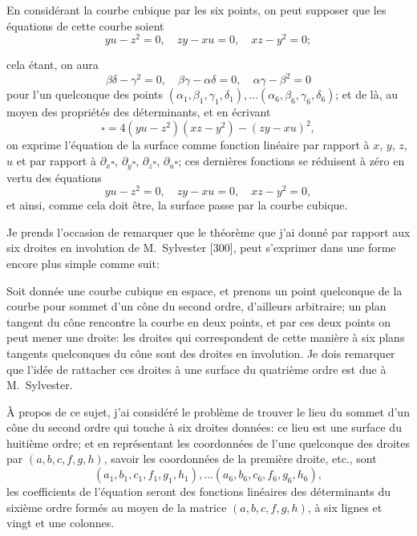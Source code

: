 \documentclass[11pt,a4paper]{article}
\begin{document}
En consid\'{e}rant la courbe cubique par les six points, on peut supposer que les \'{e}quations de cette courbe soient
\[
yu - z^2 = 0, \quad zy - xu = 0, \quad xz - y^2 = 0;
\]

\clearpage

cela \'{e}tant, on aura
\[
\beta\delta - \gamma^2 = 0, \quad \beta\gamma - \alpha\delta = 0, \quad \alpha\gamma - \beta^2 = 0
\]
pour l'un quelconque des points $(\alpha_1, \beta_1, \gamma_1, \delta_1), \ldots (\alpha_6, \beta_6, \gamma_6, \delta_6)$; et de l\`{a}, au moyen des propri\'{e}t\'{e}s des d\'{e}terminants, et en \'{e}crivant
\[
\square = 4(yu - z^2)(xz - y^2) - (zy - xu)^2,
\]
on exprime l'\'{e}quation de la surface comme fonction lin\'{e}aire par rapport \`{a} $x$, $y$, $z$, $u$ et par rapport \`{a} $\partial_x \square$, $\partial_y \square$, $\partial_z \square$, $\partial_u \square$; ces derni\`{e}res fonctions se r\'{e}duisent \`{a} z\'{e}ro en vertu des \'{e}quations
\[
yu - z^2 = 0, \quad zy - xu = 0, \quad xz - y^2 = 0,
\]
et ainsi, comme cela doit \^{e}tre, la surface passe par la courbe cubique.

Je prends l'occasion de remarquer que le th\'{e}or\`{e}me que j'ai donn\'{e} par rapport aux six droites en involution de M.~Sylvester [300], peut s'exprimer dans une forme encore plus simple comme suit:

Soit donn\'{e}e une courbe cubique en espace, et prenons un point quelconque de la courbe pour sommet d'un c\^{o}ne du second ordre, d'ailleurs arbitraire; un plan tangent du c\^{o}ne rencontre la courbe en deux points, et par ces deux points on peut mener une droite: les droites qui correspondent de cette mani\`{e}re \`{a} six plans tangents quelconques du c\^{o}ne sont des droites en involution. Je dois remarquer que l'id\'{e}e de rattacher ces droites \`{a} une surface du quatri\`{e}me ordre est due \`{a} M.~Sylvester.

\`{A} propos de ce sujet, j'ai consid\'{e}r\'{e} le probl\`{e}me de trouver le lieu du sommet d'un c\^{o}ne du second ordre qui touche \`{a} six droites donn\'{e}es: ce lieu est une surface du huiti\`{e}me ordre; et en repr\'{e}sentant les coordonn\'{e}es de l'une quelconque des droites par $(a, b, c, f, g, h)$, savoir les coordonn\'{e}es de la premi\`{e}re droite, etc., sont
\[
(a_1, b_1, c_1, f_1, g_1, h_1), \ldots (a_6, b_6, c_6, f_6, g_6, h_6),
\]
les coefficients de l'\'{e}quation seront des fonctions lin\'{e}aires des d\'{e}terminants du sixi\`{e}me ordre form\'{e}s au moyen de la matrice $(a, b, c, f, g, h)$, \`{a} six lignes et vingt et une colonnes.
\end{document}
